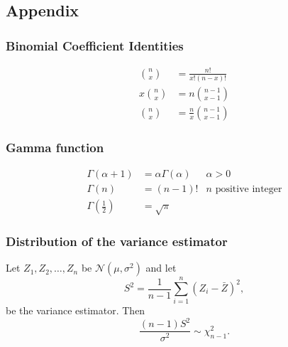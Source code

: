 \documentclass{article}
\theoremstyle{plain}
\theoremstyle{definition}
\theoremstyle{plain}
\theoremstyle{plain}
\begin{document}
\begin{multicols}{2}
\newpage

\newpage
\appendix

\section{Appendix}

\subsubsection*{Binomial Coefficient Identities}

\begin{align}
  \binom{n}{x} &= \frac{n!}{x!(n-x)!}
  \\
  x \binom{n}{x} &= n \binom{n - 1}{x - 1}
  \\
  \binom{n}{x} &= \frac{n}{x} \binom{n - 1}{x - 1}
\end{align}

\subsubsection*{Gamma function}

\begin{align}
  \Gamma(\alpha + 1) &= \alpha \Gamma(\alpha) &\alpha > 0
  \\
  \Gamma(n) &= (n - 1)! & n \text{ positive integer}
  \\
  \Gamma \left( \frac{1}{2} \right) &= \sqrt{\pi}
\end{align}

\subsubsection*{Distribution of the variance estimator}
Let $Z_1, Z_2, \ldots, Z_n$ be $\mathcal{N}(\mu, \sigma^{2})$
and let
\[
  S^2 = \frac{1}{n-1} \sum_{i = 1}^{n} (Z_i - \bar{Z})^{2},
\]
be the variance estimator.
Then
\[
  \frac{(n-1)S^2}{\sigma^{2}} \sim \chi^2_{n-1}.
\]

\end{multicols}
\end{document}
